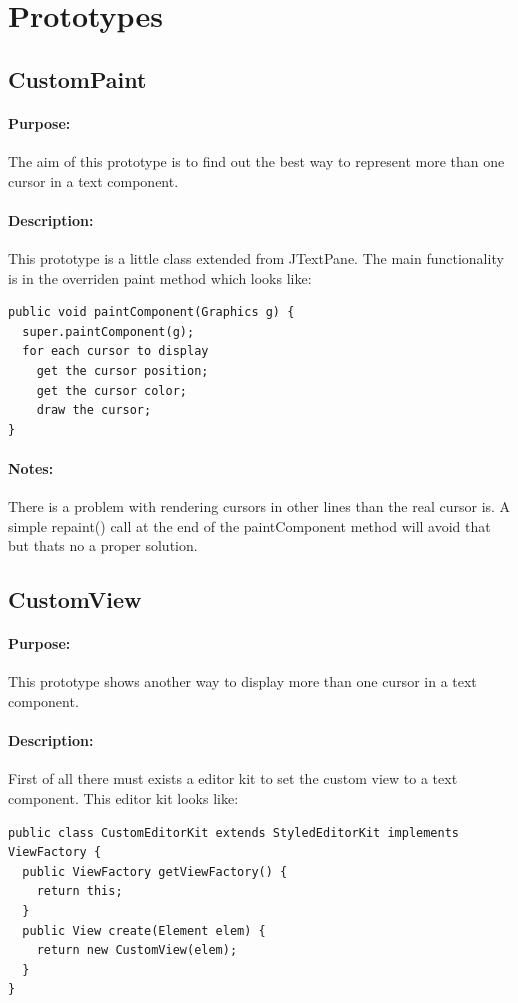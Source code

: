 \documentclass[11pt,a4paper]{article}
\begin{document}
\section{Prototypes}
\subsection{CustomPaint}
\paragraph{Purpose:}
The aim of this prototype is to find out the best way to represent more than one cursor in a text component.
\paragraph{Description:}
This prototype is a little class extended from JTextPane. The main functionality is in the overriden paint method which looks like:
\begin{verbatim}
public void paintComponent(Graphics g) {
  super.paintComponent(g);
  for each cursor to display
    get the cursor position;
    get the cursor color;
    draw the cursor;
}
\end{verbatim}
\paragraph{Notes:}
There is a problem with rendering cursors in other lines than the real cursor is. A simple repaint() call at the end of the paintComponent method will avoid that but thats no a proper solution.



\subsection{CustomView}
\paragraph{Purpose:}
This prototype shows another way to display more than one cursor in a text component.
\paragraph{Description:}

First of all there must exists a editor kit to set the custom view to a text component. This editor kit looks like:
\begin{verbatim}
public class CustomEditorKit extends StyledEditorKit implements ViewFactory {
  public ViewFactory getViewFactory() {
    return this;
  }
  public View create(Element elem) {
    return new CustomView(elem);
  }
}
\end{verbatim}
\end{document}
